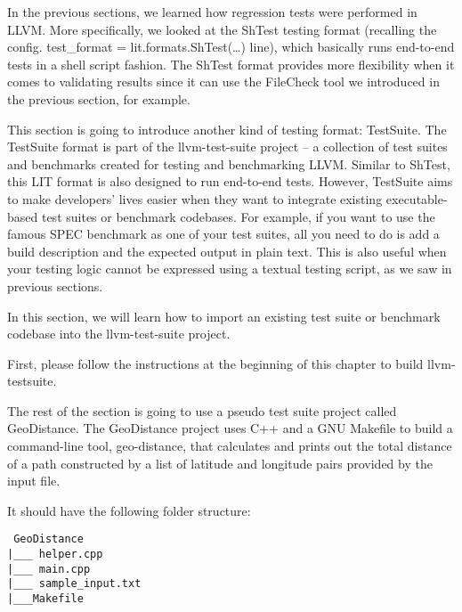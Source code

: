 
In the previous sections, we learned how regression tests were performed in LLVM. More specifically, we looked at the ShTest testing format (recalling the config. test\_format = lit.formats.ShTest(…) line), which basically runs end-to-end tests in a shell script fashion. The ShTest format provides more flexibility when it comes to validating results since it can use the FileCheck tool we introduced in the previous section, for example.

This section is going to introduce another kind of testing format: TestSuite. The TestSuite format is part of the llvm-test-suite project – a collection of test suites and benchmarks created for testing and benchmarking LLVM. Similar to ShTest, this LIT format is also designed to run end-to-end tests. However, TestSuite aims to make developers' lives easier when they want to integrate existing executable-based test suites or benchmark codebases. For example, if you want to use the famous SPEC benchmark as one of your test suites, all you need to do is add a build description and the expected output in plain text. This is also useful when your testing logic cannot be expressed using a textual testing script, as we saw in previous sections.

In this section, we will learn how to import an existing test suite or benchmark codebase into the llvm-test-suite project.


First, please follow the instructions at the beginning of this chapter to build llvm-testsuite.

The rest of the section is going to use a pseudo test suite project called GeoDistance. The GeoDistance project uses C++ and a GNU Makefile to build a command-line tool, geo-distance, that calculates and prints out the total distance of a path constructed by a list of latitude and longitude pairs provided by the input file.

It should have the following folder structure:

\begin{tcolorbox}[colback=white,colframe=black]
\tt
GeoDistance \\
\hspace*{0.5cm}|\_\_\_ helper.cpp \\
\hspace*{0.5cm}|\_\_\_ main.cpp \\
\hspace*{0.5cm}|\_\_\_ sample\_input.txt \\
\hspace*{0.5cm}|\_\_\_Makefile 
\end{tcolorbox}

